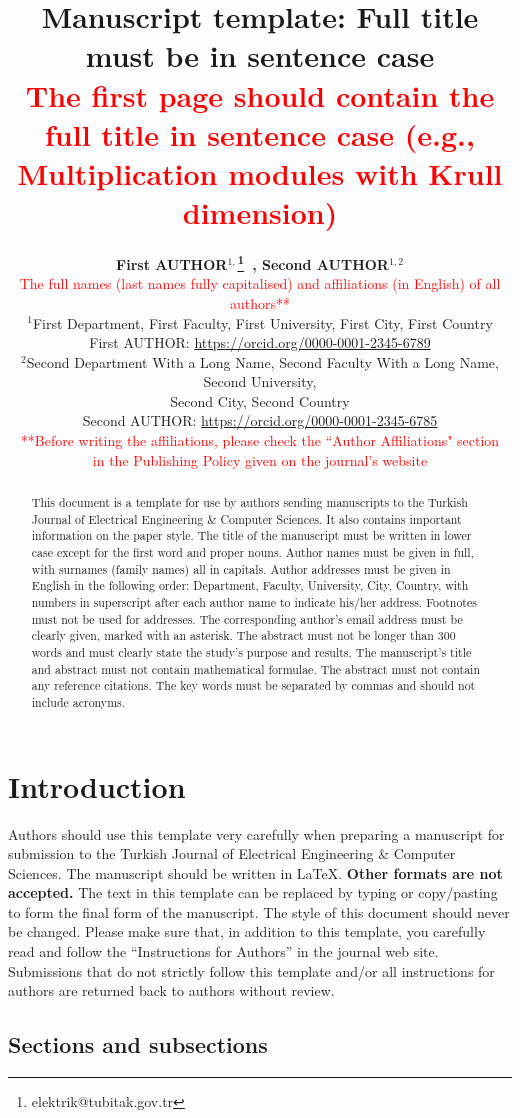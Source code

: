 \documentclass{elektr}
\title{
Manuscript template: Full title must be in sentence case \\
\textcolor{red}{\footnotesize The first page should contain the full title in sentence case (e.g., Multiplication modules with Krull dimension)}
}
\author[AUTHOR and AUTHOR]{
	\textbf{First AUTHOR$^{1,}$\thanks{elektrik@tubitak.gov.tr}~, Second AUTHOR$^{1,2}$}\\
	\textcolor{red}{The full names (last names fully capitalised) and affiliations (in English) of all authors**}\\ 
	$^{1}$First Department, First Faculty, First University, First City, First Country\\ 	First AUTHOR: \url{https://orcid.org/0000-0001-2345-6789} \\
	$^{2}$Second Department With a Long Name, Second Faculty With a Long Name, Second University,\\ Second City, Second Country\\ Second AUTHOR: \url{https://orcid.org/0000-0001-2345-6785}\\
	\textcolor{red}{**Before writing the affiliations, please check the ``Author Affiliations" section}\\ 
	\textcolor{red}{in the Publishing Policy given on the journal’s website}\\ [1.8em]

\rec{...}
\acc{...}
\finv{...}
}
\begin{document}
\maketitle

\begin{abstract}This document is a template for use by authors sending manuscripts to the Turkish Journal of Electrical Engineering {\&} Computer Sciences. It also contains important information on the paper style. The title of the manuscript must be written in lower case except for the first word and proper nouns. Author names must be given in full, with surnames (family names) all in capitals. Author addresses must be given in English in the following order: Department, Faculty, University, City, Country, with numbers in superscript after each author name to indicate his/her address. Footnotes must not be used for addresses. The corresponding author's email address must be clearly given, marked with an asterisk. The abstract must not be longer than 300 words and must clearly state the study's purpose and results. The manuscript's title and abstract must not contain mathematical formulae. The abstract must not contain any reference citations. The key words must be separated by commas and should not include acronyms.

\end{abstract}

\section{Introduction}
\label{Int}

Authors should use this template very carefully when preparing a manuscript for submission to the Turkish Journal of Electrical Engineering {\&} Computer Sciences. The manuscript should be written in \LaTeX. \textbf{Other formats are not accepted.} The text in this template can be replaced by typing or copy/pasting to form the final form of the manuscript. The style of this document should never be changed. Please make sure that, in addition to this template, you carefully read and follow the ``Instructions for Authors'' in the journal web site. Submissions that do not strictly follow this template and/or all instructions for authors are returned back to authors without review.

\subsection{Sections and subsections}
\end{document}
